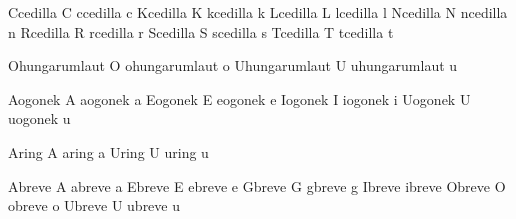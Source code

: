  Ccedilla {\buildtextcedilla C}
 ccedilla {\buildtextcedilla c}
 Kcedilla {\buildtextcedilla K}
 kcedilla {\buildtextcedilla k}
 Lcedilla {\buildtextcedilla L}
 lcedilla {\buildtextcedilla l}
 Ncedilla {\buildtextcedilla N}
 ncedilla {\buildtextcedilla n}
 Rcedilla {\buildtextcedilla R}
 rcedilla {\buildtextcedilla r}
 Scedilla {\buildtextcedilla S}
 scedilla {\buildtextcedilla s}
 Tcedilla {\buildtextcedilla T}
 tcedilla {\buildtextcedilla t}

 Ohungarumlaut {\buildtextaccent\texthungarumlaut O} 
 ohungarumlaut {\buildtextaccent\texthungarumlaut o}
 Uhungarumlaut {\buildtextaccent\texthungarumlaut U}
 uhungarumlaut {\buildtextaccent\texthungarumlaut u}

 Aogonek {\buildtextogonek A}
 aogonek {\buildtextogonek a}
 Eogonek {\buildtextogonek E}
 eogonek {\buildtextogonek e}
 Iogonek {\buildtextogonek I}
 iogonek {\buildtextogonek i}
 Uogonek {\buildtextogonek U}
 uogonek {\buildtextogonek u}

 Aring {\buildtextaccent\textring A}
 aring {\buildtextaccent\textring a}
 Uring {\buildtextaccent\textring U}
 uring {\buildtextaccent\textring u}

 Abreve {\buildtextaccent\textbreve A}
 abreve {\buildtextaccent\textbreve a}
 Ebreve {\buildtextaccent\textbreve E}
 ebreve {\buildtextaccent\textbreve e}
 Gbreve {\buildtextaccent\textbreve G}
 gbreve {\buildtextaccent\textbreve g}
 Ibreve {\buildtextaccent\textbreve \dotlessI}
 ibreve {\buildtextaccent\textbreve \dotlessi}
 Obreve {\buildtextaccent\textbreve O}
 obreve {\buildtextaccent\textbreve o}
 Ubreve {\buildtextaccent\textbreve U}
 ubreve {\buildtextaccent\textbreve u}

